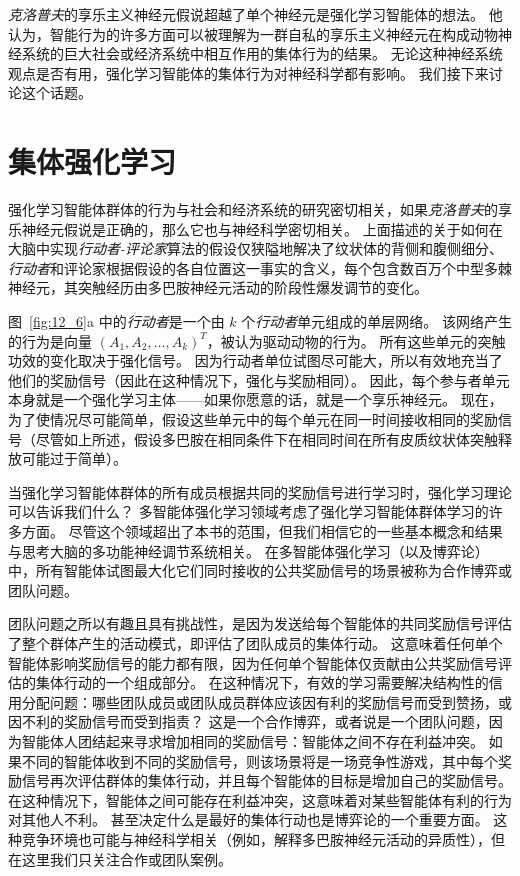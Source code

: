 \textit{克洛普夫}的享乐主义神经元假说超越了单个神经元是强化学习智能体的想法。
他认为，智能行为的许多方面可以被理解为一群自私的享乐主义神经元在构成动物神经系统的巨大社会或经济系统中相互作用的集体行为的结果。
无论这种神经系统观点是否有用，强化学习智能体的集体行为对神经科学都有影响。
我们接下来讨论这个话题。


\section{集体强化学习} \label{sec:collective_rl}

强化学习智能体群体的行为与社会和经济系统的研究密切相关，如果\textit{克洛普夫}的享乐神经元假说是正确的，那么它也与神经科学密切相关。
上面描述的关于如何在大脑中实现\textit{行动者-评论家}算法的假设仅狭隘地解决了纹状体的背侧和腹侧细分、\textit{行动者}和评论家根据假设的各自位置这一事实的含义，每个包含数百万个中型多棘神经元，其突触经历由多巴胺神经元活动的阶段性爆发调节的变化。


图~\ref{fig:12_6}a 中的\textit{行动者}是一个由 $k$ 个\textit{行动者}单元组成的单层网络。
该网络产生的行为是向量 $(A_1, A_2, ..., A_k) ^T$，被认为驱动动物的行为。
所有这些单元的突触功效的变化取决于强化信号。
因为行动者单位试图尽可能大，所以有效地充当了他们的奖励信号（因此在这种情况下，强化与奖励相同）。
因此，每个参与者单元本身就是一个强化学习主体——如果你愿意的话，就是一个享乐神经元。
现在，为了使情况尽可能简单，假设这些单元中的每个单元在同一时间接收相同的奖励信号（尽管如上所述，假设多巴胺在相同条件下在相同时间在所有皮质纹状体突触释放可能过于简单）。


当强化学习智能体群体的所有成员根据共同的奖励信号进行学习时，强化学习理论可以告诉我们什么？
多智能体强化学习领域考虑了强化学习智能体群体学习的许多方面。
尽管这个领域超出了本书的范围，但我们相信它的一些基本概念和结果与思考大脑的多功能神经调节系统相关。
在多智能体强化学习（以及博弈论）中，所有智能体试图最大化它们同时接收的公共奖励信号的场景被称为合作博弈或团队问题。


团队问题之所以有趣且具有挑战性，是因为发送给每个智能体的共同奖励信号评估了整个群体产生的活动模式，即评估了团队成员的集体行动。
这意味着任何单个智能体影响奖励信号的能力都有限，因为任何单个智能体仅贡献由公共奖励信号评估的集体行动的一个组成部分。
在这种情况下，有效的学习需要解决结构性的信用分配问题：哪些团队成员或团队成员群体应该因有利的奖励信号而受到赞扬，或因不利的奖励信号而受到指责？
这是一个合作博弈，或者说是一个团队问题，因为智能体人团结起来寻求增加相同的奖励信号：智能体之间不存在利益冲突。
如果不同的智能体收到不同的奖励信号，则该场景将是一场竞争性游戏，其中每个奖励信号再次评估群体的集体行动，并且每个智能体的目标是增加自己的奖励信号。
在这种情况下，智能体之间可能存在利益冲突，这意味着对某些智能体有利的行为对其他人不利。
甚至决定什么是最好的集体行动也是博弈论的一个重要方面。
这种竞争环境也可能与神经科学相关（例如，解释多巴胺神经元活动的异质性），但在这里我们只关注合作或团队案例。


